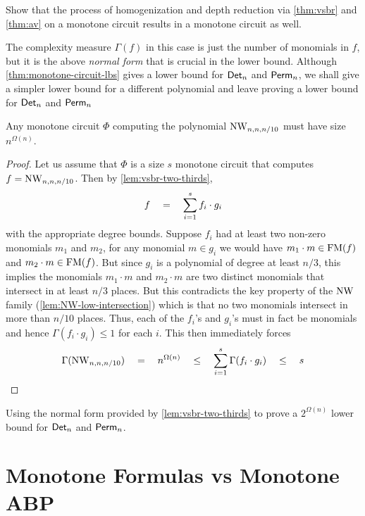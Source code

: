\begin{exercise}
Show that the process of homogenization and depth reduction via \autoref{thm:vsbr} and \autoref{thm:av} on a monotone circuit results in a  monotone circuit as well. 
\end{exercise}


The complexity measure $\Gamma(f)$ in this case is just the number of monomials in $f$, but it is the above \emph{normal form} that is crucial in the lower bound. 
Although \autoref{thm:monotone-circuit-lbs} gives a lower bound for $\operatorname{\mathsf{Det}}_n$ and $\operatorname{\mathsf{Perm}}_n$, we shall give a simpler lower bound for a different polynomial and leave proving a lower bound for $\operatorname{\mathsf{Det}}_n$ and $\operatorname{\mathsf{Perm}}_n$ 


\begin{theorem}
Any monotone circuit $\Phi$ computing the polynomial $\operatorname{\mathrm{NW}}_{n,n,n/10}$  must have size $n^{\Omega(n)}$. 
\end{theorem}
\begin{proof}
  Let us assume that $\Phi$ is a size $s$ monotone circuit that computes $f = \operatorname{\mathrm{NW}}_{n,n,n/10}$. 
Then by \autoref{lem:vsbr-two-thirds},
  \[
  f \quad = \quad \sum_{i=1}^s f_i \cdot g_i
  \]
  with the appropriate degree bounds. 
Suppose $f_i$ had at least two non-zero monomials $m_1$ and $m_2$, for any monomial $m \in g_i$ we would have $m_1 \cdot m \in \mathrm{FM}(f)$ and $m_2 \cdot m \in \mathrm{FM}(f)$. 
But since $g_i$ is a polynomial of degree at least $n/3$, this implies the monomials $m_1\cdot m$ and $m_2 \cdot m$ are two distinct monomials that intersect in at least $n/3$ places. 
But this contradicts the key property of the $\operatorname{\mathrm{NW}}$ family (\autoref{lem:NW-low-intersection}) which is that no two monomials intersect in more than $n/10$ places. 
Thus, each of the $f_i$'s and $g_i$'s must in fact be monomials and hence $\Gamma(f_i\cdot g_i) \leq 1$ for each $i$. 
This then immediately forces 
\[
\Gamma(\operatorname{\mathrm{NW}}_{n,n,n/10}) \quad = \quad n^{\Omega(n)} \quad \leq \quad \sum_{i=1}^s \Gamma(f_i \cdot g_i) \quad \leq \quad s
\]
\end{proof}

\begin{exercise}
Using the normal form provided by \autoref{lem:vsbr-two-thirds} to prove a $2^{\Omega(n)}$ lower bound for $\operatorname{\mathsf{Det}}_n$ and $\operatorname{\mathsf{Perm}}_n$. 
\end{exercise}

\section{Monotone Formulas vs Monotone ABP}


